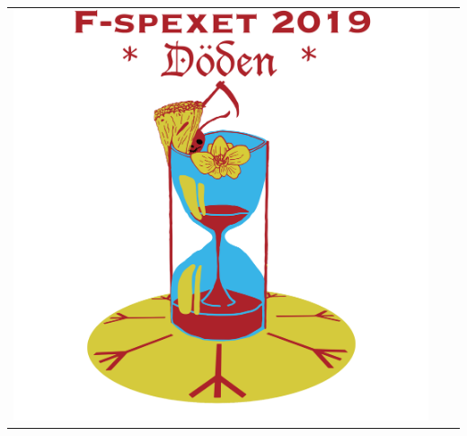 \begin{tabular}{ccc}
    \includegraphics[width=\gamlaAffischerLength]{Bilder/TidigareSpexloggor/Doden.png}
\end{tabular}

